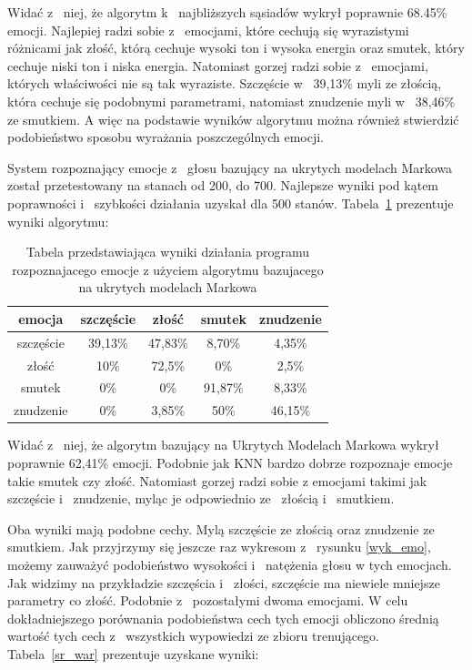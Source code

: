 \documentclass[declaration,shortabstract]{iithesis}
\begin{document}
Widać z~ niej, że algorytm k~ najbliższych sąsiadów wykrył poprawnie 68.45\% emocji. Najlepiej radzi sobie z~ emocjami, które cechują się wyrazistymi różnicami jak złość, którą cechuje wysoki ton i wysoka energia oraz smutek, który cechuje niski ton i niska energia. Natomiast gorzej radzi sobie z~ emocjami, których właściwości nie są tak wyraziste. Szczęście w~ 39,13\% myli ze złością, która cechuje się podobnymi parametrami, natomiast znudzenie myli w~ 38,46\% ze smutkiem. A więc na podstawie wyników algorytmu można również stwierdzić podobieństwo sposobu wyrażania poszczególnych emocji.

System rozpoznający emocje z~ głosu bazujący na ukrytych modelach Markowa został przetestowany na stanach od 200, do 700. Najlepsze wyniki pod kątem poprawności i~ szybkości działania uzyskał dla 500 stanów. Tabela~\ref{HMM_result} prezentuje wyniki algorytmu: 

\begin{table}[p]
\caption{Tabela przedstawiająca wyniki działania programu rozpoznajacego emocje z użyciem algorytmu bazujacego na ukrytych modelach Markowa}
\begin{center}
  \begin{tabular}{| c | c | c | c | c |}
    \hline
    emocja & szczęście & złość & smutek & znudzenie \\ \hline
    szczęście & 39,13\% & 47,83\% & 8,70\% & 4,35\% \\ \hline
	złość & 10\% & 72,5\% & 0\% & 2,5\% \\ \hline
	smutek & 0\% & 0\% & 91,87\% & 8,33\% \\ \hline
	znudzenie & 0\% & 3,85\% & 50\% & 46,15\% \\
    \hline
  \end{tabular}
  \label{HMM_result}
\end{center}
\end{table}

Widać z~ niej, że algorytm bazujący na Ukrytych Modelach Markowa wykrył poprawnie 62,41\% emocji. Podobnie jak KNN bardzo dobrze rozpoznaje emocje takie smutek czy złość. Natomiast gorzej radzi sobie z emocjami takimi jak szczęście i~ znudzenie, myląc je odpowiednio ze~ złością i~ smutkiem.

Oba wyniki mają podobne cechy. Mylą szczęście ze złością oraz znudzenie ze smutkiem. Jak przyjrzymy się jeszcze raz wykresom z~ rysunku \ref{wyk_emo}, możemy zauważyć podobieństwo wysokości i~ natężenia głosu w tych emocjach. Jak widzimy na przykładzie szczęścia i~ złości, szczęście ma niewiele mniejsze parametry co złość. Podobnie z~ pozostałymi dwoma emocjami. W celu dokładniejszego porównania podobieństwa cech tych emocji obliczono średnią wartość tych cech z~ wszystkich wypowiedzi ze zbioru trenującego. Tabela~\ref{sr_war} prezentuje uzyskane wyniki:
\end{document}
